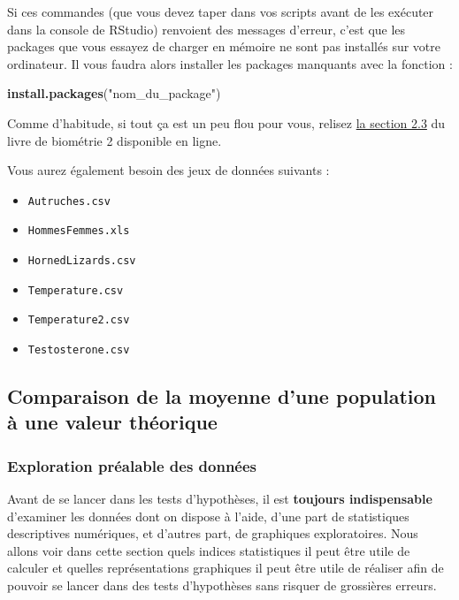 \documentclass[a4paperpaper,]{article}
\newenvironment{Shaded}{\begin{snugshade}}{\end{snugshade}}
\newcommand{\KeywordTok}[1]{\textcolor[rgb]{0.12,0.11,0.11}{\textbf{#1}}}
\newcommand{\NormalTok}[1]{\textcolor[rgb]{0.12,0.11,0.11}{#1}}
\newcommand{\StringTok}[1]{\textcolor[rgb]{0.75,0.01,0.01}{#1}}
\providecommand{\tightlist}{%
  \setlength{\itemsep}{0pt}\setlength{\parskip}{0pt}}
\begin{document}
Si ces commandes (que vous devez taper dans vos scripts avant de les exécuter dans la console de RStudio) renvoient des messages d'erreur, c'est que les packages que vous essayez de charger en mémoire ne sont pas installés sur votre ordinateur. Il vous faudra alors installer les packages manquants avec la fonction :

\begin{Shaded}
\begin{Highlighting}[]
\KeywordTok{install.packages}\NormalTok{(}\StringTok{"nom_du_package"}\NormalTok{)}
\end{Highlighting}
\end{Shaded}

Comme d'habitude, si tout ça est un peu flou pour vous, relisez \href{https://besibo.github.io/Biometrie2/bases.html\#charger-un-package-en-memoire}{la section 2.3} du livre de biométrie 2 disponible en ligne.

Vous aurez également besoin des jeux de données suivants :

\begin{itemize}
\tightlist
\item
  \texttt{Autruches.csv}
\item
  \texttt{HommesFemmes.xls}
\item
  \texttt{HornedLizards.csv}
\item
  \texttt{Temperature.csv}
\item
  \texttt{Temperature2.csv}
\item
  \texttt{Testosterone.csv}
\end{itemize}

\hypertarget{comparaison-de-la-moyenne-dune-population-a-une-valeur-theorique}{%
\subsection{Comparaison de la moyenne d'une population à une valeur théorique}\label{comparaison-de-la-moyenne-dune-population-a-une-valeur-theorique}}

\hypertarget{Explo}{%
\subsubsection{Exploration préalable des données}\label{Explo}}

Avant de se lancer dans les tests d'hypothèses, il est \textbf{toujours indispensable} d'examiner les données dont on dispose à l'aide, d'une part de statistiques descriptives numériques, et d'autres part, de graphiques exploratoires. Nous allons voir dans cette section quels indices statistiques il peut être utile de calculer et quelles représentations graphiques il peut être utile de réaliser afin de pouvoir se lancer dans des tests d'hypothèses sans risquer de grossières erreurs.
\end{document}
